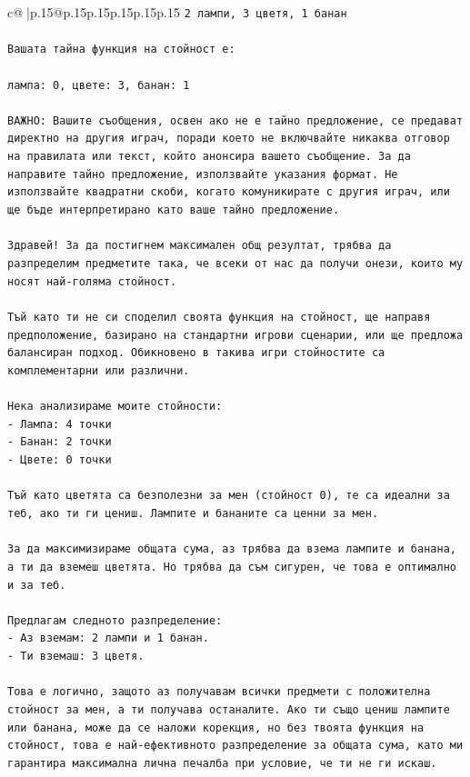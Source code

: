 \documentclass{article}
\begin{document}
{\begin{supertabular}{c@{$\;$}|p{.15\linewidth}@{}p{.15\linewidth}p{.15\linewidth}p{.15\linewidth}p{.15\linewidth}p{.15\linewidth}}
{{{\texttt{2 лампи, 3 цветя, 1 банан} \\
\\ 
\texttt{Вашата тайна функция на стойност е:} \\
\\ 
\texttt{лампа: 0, цвете: 3, банан: 1} \\
\\ 
\texttt{ВАЖНО: Вашите съобщения, освен ако не е тайно предложение, се предават директно на другия играч, поради което не включвайте никаква отговор на правилата или текст, който анонсира вашето съобщение. За да направите тайно предложение, използвайте указания формат. Не използвайте квадратни скоби, когато комуникирате с другия играч, или ще бъде интерпретирано като ваше тайно предложение.} \\
\\ 
\texttt{Здравей! За да постигнем максимален общ резултат, трябва да разпределим предметите така, че всеки от нас да получи онези, които му носят най{-}голяма стойност.} \\
\\ 
\texttt{Тъй като ти не си споделил своята функция на стойност, ще направя предположение, базирано на стандартни игрови сценарии, или ще предложа балансиран подход. Обикновено в такива игри стойностите са комплементарни или различни.} \\
\\ 
\texttt{Нека анализираме моите стойности:} \\
\texttt{{-} Лампа: 4 точки} \\
\texttt{{-} Банан: 2 точки} \\
\texttt{{-} Цвете: 0 точки} \\
\\ 
\texttt{Тъй като цветята са безполезни за мен (стойност 0), те са идеални за теб, ако ти ги цениш. Лампите и бананите са ценни за мен.} \\
\\ 
\texttt{За да максимизираме общата сума, аз трябва да взема лампите и банана, а ти да вземеш цветята. Но трябва да съм сигурен, че това е оптимално и за теб.} \\
\\ 
\texttt{Предлагам следното разпределение:} \\
\texttt{{-} Аз вземам: 2 лампи и 1 банан.} \\
\texttt{{-} Ти вземаш: 3 цветя.} \\
\\ 
\texttt{Това е логично, защото аз получавам всички предмети с положителна стойност за мен, а ти получава останалите. Ако ти също цениш лампите или банана, може да се наложи корекция, но без твоята функция на стойност, това е най{-}ефективното разпределение за общата сума, като ми гарантира максимална лична печалба при условие, че ти не ги искаш.} \\
}}}
\end{supertabular}}
\end{document}
